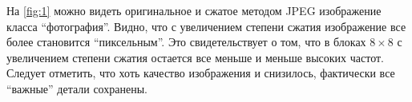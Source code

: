 \documentclass[12pt,a4paper]{article}
\begin{document}
            На \autoref{fig:1} можно видеть оригинальное и сжатое методом JPEG изображение класса \enquote{фотография}. Видно, что с увеличением степени сжатия изображение все более становится \enquote{пиксельным}. Это свидетельствует о том, что в блоках $8\times 8$ с увеличением степени сжатия остается все меньше и меньше высоких частот. Следует отметить, что хоть качество изображения и снизилось, фактически все \enquote{важные} детали сохранены.
            \begin{figure}[!htb]%
                \centering
                \hspace{8pt}%
                \hspace{8pt}%

\end{figure}
\end{document}
